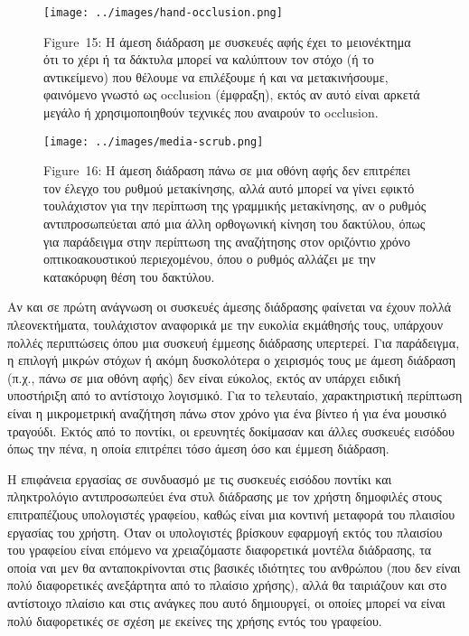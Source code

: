 \documentclass[
]{article}
\begin{document}
\leavevmode{}%
\begin{figure}
\hypertarget{fig:hand-occlusion}{%
\centering
\texttt{[image: ../images/hand-occlusion.png]}
\caption{Figure~15: Η άμεση διάδραση με συσκευές αφής έχει το
μειονέκτημα ότι το χέρι ή τα δάκτυλα μπορεί να καλύπτουν τον στόχο (ή το
αντικείμενο) που θέλουμε να επιλέξουμε ή και να μετακινήσουμε, φαινόμενο
γνωστό ως occlusion (έμφραξη), εκτός αν αυτό είναι αρκετά μεγάλο ή
χρησιμοποιηθούν τεχνικές που αναιρούν το
occlusion.}\label{fig:hand-occlusion}
}
\end{figure}

\leavevmode{}%
\begin{figure}
\hypertarget{fig:media-scrub}{%
\centering
\texttt{[image: ../images/media-scrub.png]}
\caption{Figure~16: Η άμεση διάδραση πάνω σε μια οθόνη αφής δεν
επιτρέπει τον έλεγχο του ρυθμού μετακίνησης, αλλά αυτό μπορεί να γίνει
εφικτό τουλάχιστον για την περίπτωση της γραμμικής μετακίνησης, αν ο
ρυθμός αντιπροσωπεύεται από μια άλλη ορθογωνική κίνηση του δακτύλου,
όπως για παράδειγμα στην περίπτωση της αναζήτησης στον οριζόντιο χρόνο
οπτικοακουστικού περιεχομένου, όπου ο ρυθμός αλλάζει με την κατακόρυφη
θέση του δακτύλου.}\label{fig:media-scrub}
}
\end{figure}

Αν και σε πρώτη ανάγνωση οι συσκευές άμεσης διάδρασης φαίνεται να έχουν
πολλά πλεονεκτήματα, τουλάχιστον αναφορικά με την ευκολία εκμάθησής
τους, υπάρχουν πολλές περιπτώσεις όπου μια συσκευή έμμεσης διάδρασης
υπερτερεί. Για παράδειγμα, η επιλογή μικρών στόχων ή ακόμη δυσκολότερα ο
χειρισμός τους με άμεση διάδραση (π.χ., πάνω σε μια οθόνη αφής) δεν
είναι εύκολος, εκτός αν υπάρχει ειδική υποστήριξη από το αντίστοιχο
λογισμικό. Για το τελευταίο, χαρακτηριστική περίπτωση είναι η
μικρομετρική αναζήτηση πάνω στον χρόνο για ένα βίντεο ή για ένα μουσικό
τραγούδι. Εκτός από το ποντίκι, οι ερευνητές δοκίμασαν και άλλες
συσκευές εισόδου όπως την πένα, η οποία επιτρέπει τόσο άμεση όσο και
έμμεση διάδραση.

Η επιφάνεια εργασίας σε συνδυασμό με τις συσκευές εισόδου ποντίκι και
πληκτρολόγιο αντιπροσωπεύει ένα στυλ διάδρασης με τον χρήστη δημοφιλές
στους επιτραπέζιους υπολογιστές γραφείου, καθώς είναι μια κοντινή
μεταφορά του πλαισίου εργασίας του χρήστη. Όταν οι υπολογιστές βρίσκουν
εφαρμογή εκτός του πλαισίου του γραφείου είναι επόμενο να χρειαζόμαστε
διαφορετικά μοντέλα διάδρασης, τα οποία ναι μεν θα ανταποκρίνονται στις
βασικές ιδιότητες του ανθρώπου (που δεν είναι πολύ διαφορετικές
ανεξάρτητα από το πλαίσιο χρήσης), αλλά θα ταιριάζουν και στο αντίστοιχο
πλαίσιο και στις ανάγκες που αυτό δημιουργεί, οι οποίες μπορεί να είναι
πολύ διαφορετικές σε σχέση με εκείνες της χρήσης εντός του γραφείου.
\end{document}
